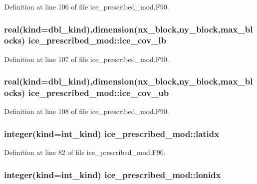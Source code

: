 Definition at line 106 of file ice\_\-prescribed\_\-mod.F90.\hypertarget{namespaceice__prescribed__mod_a2f6a0d3d485195c75861395c78cc22aa}{
\subsubsection[{ice\_\-cov\_\-lb}]{\setlength{\rightskip}{0pt plus 5cm}real(kind=dbl\_\-kind),dimension(nx\_\-block,ny\_\-block,max\_\-blocks) {\bf ice\_\-prescribed\_\-mod::ice\_\-cov\_\-lb}}}
\label{namespaceice__prescribed__mod_a2f6a0d3d485195c75861395c78cc22aa}


Definition at line 107 of file ice\_\-prescribed\_\-mod.F90.\hypertarget{namespaceice__prescribed__mod_a9c50464ba0a337c6fd03cec3a7338897}{
\subsubsection[{ice\_\-cov\_\-ub}]{\setlength{\rightskip}{0pt plus 5cm}real(kind=dbl\_\-kind),dimension(nx\_\-block,ny\_\-block,max\_\-blocks) {\bf ice\_\-prescribed\_\-mod::ice\_\-cov\_\-ub}}}
\label{namespaceice__prescribed__mod_a9c50464ba0a337c6fd03cec3a7338897}


Definition at line 108 of file ice\_\-prescribed\_\-mod.F90.\hypertarget{namespaceice__prescribed__mod_a406e46eaa55988c516d70a9e9ed1fb2a}{
\subsubsection[{latidx}]{\setlength{\rightskip}{0pt plus 5cm}integer(kind=int\_\-kind) {\bf ice\_\-prescribed\_\-mod::latidx}}}
\label{namespaceice__prescribed__mod_a406e46eaa55988c516d70a9e9ed1fb2a}


Definition at line 82 of file ice\_\-prescribed\_\-mod.F90.\hypertarget{namespaceice__prescribed__mod_a21240c657fdbc312b6cdd4c31395ede0}{
\subsubsection[{lonidx}]{\setlength{\rightskip}{0pt plus 5cm}integer(kind=int\_\-kind) {\bf ice\_\-prescribed\_\-mod::lonidx}}}
\label{namespaceice__prescribed__mod_a21240c657fdbc312b6cdd4c31395ede0}


